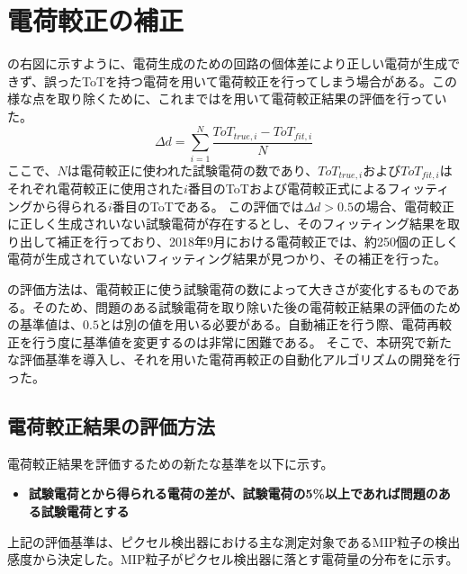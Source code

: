 \section{電荷較正の補正}
\label{sec:calibhosei}
の右図に示すように、電荷生成のための回路の個体差により正しい電荷が生成できず、誤ったToTを持つ電荷を用いて電荷較正を行ってしまう場合がある。この様な点を取り除くために、これまではを用いて電荷較正結果の評価を行っていた。
\begin{equation}
  \label{eq:averagedistance}
  \Delta d = \sum_{i=1}^{N} \frac{ToT_{true, i} - ToT_{fit, i}}{N}
\end{equation}
ここで、$N$は電荷較正に使われた試験電荷の数であり、$ToT_{true, i}$および$ToT_{fit, i}$はそれぞれ電荷較正に使用された$i$番目のToTおよび電荷較正式によるフィッティングから得られる$i$番目のToTである。
この評価では$\Delta d > 0.5$の場合、電荷較正に正しく生成されいない試験電荷が存在するとし、そのフィッティング結果を取り出して補正を行っており、2018年9月における電荷較正では、約250個の正しく電荷が生成されていないフィッティング結果が見つかり、その補正を行った。


の評価方法は、電荷較正に使う試験電荷の数によって大きさが変化するものである。そのため、問題のある試験電荷を取り除いた後の電荷較正結果の評価のための基準値は、$0.5$とは別の値を用いる必要がある。自動補正を行う際、電荷再較正を行う度に基準値を変更するのは非常に困難である。
そこで、本研究で新たな評価基準を導入し、それを用いた電荷再較正の自動化アルゴリズムの開発を行った。


\subsection{電荷較正結果の評価方法}
電荷較正結果を評価するための新たな基準を以下に示す。
\begin{itemize}
  \item[]\textbf{試験電荷とから得られる電荷の差が、試験電荷の5\%以上であれば問題のある試験電荷とする}
\end{itemize}
上記の評価基準は、ピクセル検出器における主な測定対象であるMIP粒子の検出感度から決定した。MIP粒子がピクセル検出器に落とす電荷量の分布をに示す。

